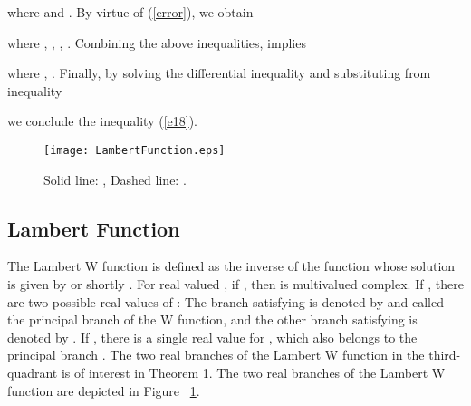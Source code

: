 \documentclass[12pt,draftcls,onecolumn]{IEEEtran}
\newcommand{\carre} {\hfill }
\begin{document}
where  and  . By virtue of (\ref{error}), we obtain

where , , , . Combining the above inequalities, implies


where , . Finally, by solving the differential inequality  and substituting from inequality

we conclude the inequality (\ref{e18}). \carre


\begin{figure}[b]
\centering
\texttt{[image: LambertFunction.eps]}
\caption{ Solid line: , Dashed line: .}
\label{fig:Lambert}
\end{figure}
\subsection{Lambert Function}
The Lambert W function is defined as the inverse of the function  whose solution is given by  or shortly . For real valued , if , then  is multivalued complex. If , there are two possible real values of : The branch satisfying  is denoted by  and called the principal branch of the W function, and the other branch satisfying  is denoted by  . If , there is a single real value for , which also belongs to the principal branch  \cite{c21}. The two real branches of the Lambert W function in the third-quadrant is of interest in Theorem 1. The two real branches of the Lambert W function are depicted in Figure ~\ref{fig:Lambert}.


 

\end{document}
